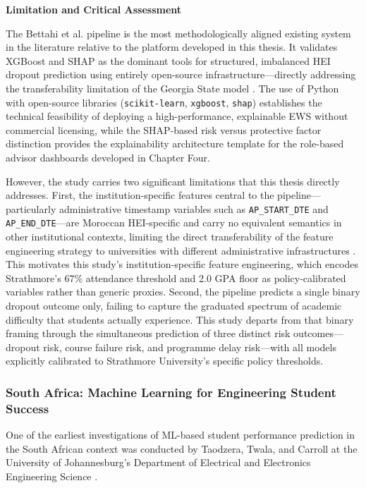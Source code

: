 \documentclass[12pt]{report}
\begin{document}
\textbf{Limitation and Critical Assessment}

The Bettahi et al. pipeline is the most methodologically aligned existing
system in the literature relative to the platform developed in this
thesis. It validates XGBoost and SHAP as the dominant tools for
structured, imbalanced HEI dropout prediction using entirely open-source
infrastructure---directly addressing the transferability limitation of
the Georgia State model \parencite{bettahi2025}. The use of Python with
open-source libraries (\texttt{scikit-learn}, \texttt{xgboost},
\texttt{shap}) establishes the technical feasibility of deploying a
high-performance, explainable EWS without commercial licensing, while
the SHAP-based risk versus protective factor distinction provides the
explainability architecture template for the role-based advisor
dashboards developed in Chapter Four.

However, the study carries two significant limitations that this thesis
directly addresses. First, the institution-specific features central to
the pipeline---particularly administrative timestamp variables such as
\texttt{AP\_START\_DTE} and \texttt{AP\_END\_DTE}---are Moroccan
HEI-specific and carry no equivalent semantics in other institutional
contexts, limiting the direct transferability of the feature engineering
strategy to universities with different administrative infrastructures
\parencite{bettahi2025}. This motivates this study's institution-specific
feature engineering, which encodes Strathmore's 67\% attendance threshold
and 2.0 GPA floor as policy-calibrated variables rather than generic
proxies. Second, the pipeline predicts a single binary dropout outcome
only, failing to capture the graduated spectrum of academic difficulty
that students actually experience. This study departs from that binary
framing through the simultaneous prediction of three distinct risk
outcomes---dropout risk, course failure risk, and programme delay
risk---with all models explicitly calibrated to Strathmore University's
specific policy thresholds.

\subsubsection{South Africa: Machine Learning for Engineering Student Success}

One of the earliest investigations of ML-based student performance
prediction in the South African context was conducted by Taodzera, Twala,
and Carroll at the University of Johannesburg's Department of Electrical
and Electronics Engineering Science \parencite{taodzera2016}.
\end{document}
